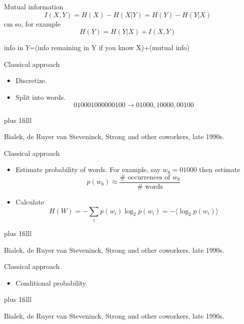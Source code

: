 \documentclass{beamer}
\newcommand{\btVFill}{\vskip0pt plus 1filll}
\begin{document}
\begin{frame}{Mutual information}
\color{dark}
$$
I(X,Y)=H(X)-H(X|Y)=H(Y)-H(Y|X)
$$
\color{black}
 cm
so, for example
\color{dark}
$$
H(Y)=H(Y|X)+I(X,Y)
$$
\color{black}
\begin{center}
info in $Y$=(info remaining in Y if you know X)+(mutual info)
\end{center}
\end{frame}


\begin{frame}{Classical approach}
\begin{itemize}
\item Discretize.
\color{reddish}
\begin{center}

\end{center}
\color{black}
\item Split into words.
\color{dark}
$$010001000000100\rightarrow 01000,10000,00100$$
\color{black}
\end{itemize}
\btVFill
\begin{flushright}
\tiny{Bialek, de Ruyer van Steveninck, Strong and other coworkers, late 1990s.}
\end{flushright}
\end{frame}

\begin{frame}{Classical approach}
\begin{itemize}
\item Estimate probability of words. For example, say $w_8=01000$ then estimate
\color{dark}
$$p(w_8)\approx\frac{\#\mbox{ occurrences of }w_8}{\#\mbox{ words}}$$ 
\color{black}
\item Calculate
\color{dark}
$$H(W)=-\sum_i p(w_i)\log_2 p(w_i) =-\langle\log_2 p(w_i)\rangle$$ 
\color{black}
\end{itemize}
\btVFill
\begin{flushright}
\tiny{Bialek, de Ruyer van Steveninck, Strong and other coworkers, late 1990s.}
\end{flushright}
\end{frame}


\begin{frame}{Classical approach}
\begin{itemize}
\item Conditional probability.
\color{reddish}
\begin{center}

\end{center}
\color{black}
\end{itemize}
\btVFill
\begin{flushright}
\tiny{Bialek, de Ruyer van Steveninck, Strong and other coworkers, late 1990s.}
\end{flushright}
\end{frame}
\end{document}
